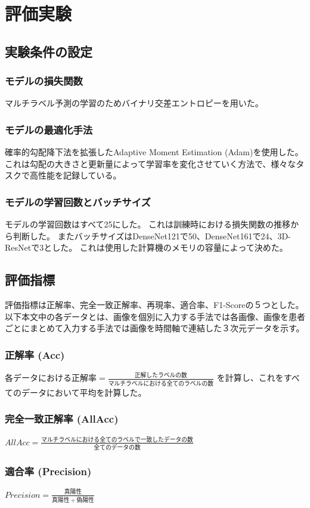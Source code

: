 \section{評価実験}
\subsection{実験条件の設定}
\subsubsection{モデルの損失関数}
マルチラベル予測の学習のためバイナリ交差エントロピーを用いた。
\subsubsection{モデルの最適化手法}
確率的勾配降下法\cite{SGD}を拡張したAdaptive Moment Estimation (Adam)\cite{Adam}を使用した。
これは勾配の大きさと更新量によって学習率を変化させていく方法で、様々なタスクで高性能を記録している。
\subsubsection{モデルの学習回数とバッチサイズ}
モデルの学習回数はすべて25にした。
これは訓練時における損失関数の推移から判断した。
またバッチサイズはDenseNet121で50、DenseNet161で24、3D-ResNetで3とした。
これは使用した計算機のメモリの容量によって決めた。
\subsection{評価指標}
評価指標は正解率、完全一致正解率、再現率、適合率、F1-Scoreの５つとした。
以下本文中の各データとは、画像を個別に入力する手法では各画像、画像を患者ごとにまとめて入力する手法では画像を時間軸で連結した３次元データを示す。
\subsubsection{正解率 (Acc)}
$各データにおける正解率 = \frac{正解したラベルの数}{マルチラベルにおける全てのラベルの数}$
を計算し、これをすべてのデータにおいて平均を計算した。
\subsubsection{完全一致正解率 (AllAcc)}
$AllAcc=\frac{マルチラベルにおける全てのラベルで一致したデータの数}{全てのデータの数}$
\subsubsection{適合率 (Precision)}
$Precision = \frac{真陽性}{真陽性+偽陽性}$

